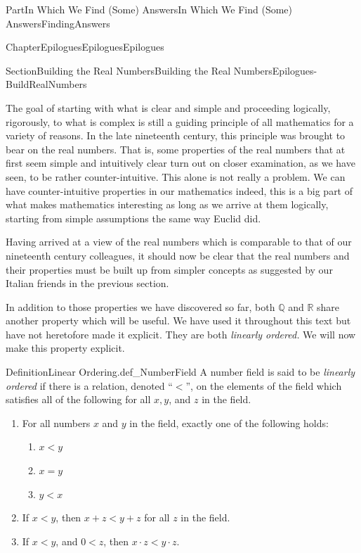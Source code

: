 \documentclass[oneside,10pt,]{book}
\numberwithin{equation}{part}
\newcommand{\RR}{\mathbb {R}}
\newcommand{\QQ}{\mathbb {Q}}
\newcommand{\lt}{<}
\begin{document}
\begin{partptx}{Part}{In Which We Find (Some) Answers}{}{In Which We Find (Some) Answers}{}{}{FindingAnswers}
\begin{chapterptx}{Chapter}{Epilogues}{}{Epilogues}{}{}{Epilogues}
\begin{sectionptx}{Section}{Building the Real Numbers}{}{Building the Real Numbers}{}{}{Epilogues-BuildRealNumbers}
\begin{introduction}{}
\par
The goal of starting with what is clear and simple and proceeding logically, rigorously, to what is complex is still a guiding principle of all mathematics for a variety of reasons.  In the late nineteenth century, this principle was brought to bear on the real numbers.  That is, some properties of the real numbers that at first seem simple and intuitively clear turn out on closer examination, as we have seen, to be rather counter-intuitive.  This alone is not really a problem.  We can have counter-intuitive properties in our mathematics \textemdash{} indeed, this is a big part of what makes mathematics interesting \textemdash{} as long as we arrive at them logically, starting from simple assumptions the same way Euclid did.%
\par
Having arrived at a view of the real numbers which is comparable to that of our nineteenth century colleagues, it should now be clear that the real numbers and their properties must be built up from simpler concepts as suggested by our Italian friends in the previous section.%
\par
In addition to those properties we have discovered so far, both \(\QQ\) and \(\RR\) share another property which will be useful. We have used it throughout this text but have not heretofore made it explicit. They are both \emph{linearly ordered.} We will now make this property explicit.%
\begin{definition}{Definition}{Linear Ordering.}{def_NumberField}%
%
A number field is said to be \emph{linearly ordered} if there is a relation, denoted ``\(\lt \)'', on the elements of the field which satisfies all of the following for all \(x, y\), and \(z\) in the field.%
\par
%
\begin{enumerate}
\item{}For all numbers \(x\) and \(y\) in the field, exactly one of the following holds:%
\par
%
\begin{enumerate}
\item{}\(\displaystyle x\lt y\)%
\item{}\(\displaystyle x=y\)%
\item{}\(\displaystyle y\lt x\)%
\end{enumerate}
%
\item{}If \(x\lt y\), then \(x+z\lt y+z\) for all \(z\) in the field.%
\item{}If \(x\lt y\), and \(0\lt z\), then \(x\cdot z \lt y\cdot z\).%

\end{enumerate}
\end{definition}
\end{introduction}
\end{sectionptx}
\end{chapterptx}
\end{partptx}
\end{document}
